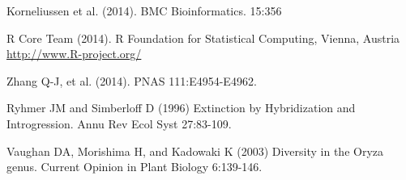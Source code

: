 \documentclass[final]{beamer}
\begin{document}
\begin{frame}[t]
\begin{multicols}{3}
\begin{thebibliography}{99}
 Korneliussen et al. (2014). BMC Bioinformatics. 15:356

 R Core Team (2014). R Foundation for Statistical Computing, Vienna, Austria \url{http://www.R-project.org/}

 Zhang Q-J, et al. (2014). PNAS 111:E4954-E4962.

Ryhmer JM and Simberloff D (1996) Extinction by Hybridization and Introgression. Annu Rev Ecol Syst 27:83-109.

Vaughan DA, Morishima H, and Kadowaki K (2003) Diversity in the Oryza genus. Current Opinion in Plant Biology 6:139-146.

\end{thebibliography}

\end{multicols}

\end{frame}
\end{document}
